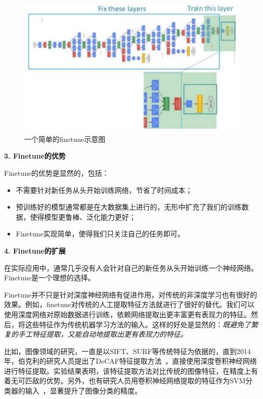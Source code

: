 \begin{figure}[htbp]
	\centering
	\includegraphics[scale=0.6]{./figures/fig-deep-finetune.pdf}
	\caption{一个简单的finetune示意图}
	\label{fig-deep-finetune}
\end{figure}

\textbf{3. Finetune的优势}

Finetune的优势是显然的，包括：

\begin{itemize}
	\item 不需要针对新任务从头开始训练网络，节省了时间成本；
	\item 预训练好的模型通常都是在大数据集上进行的，无形中扩充了我们的训练数据，使得模型更鲁棒、泛化能力更好；
	\item Finetune实现简单，使得我们只关注自己的任务即可。
\end{itemize}

\textbf{4. Finetune的扩展}

在实际应用中，通常几乎没有人会针对自己的新任务从头开始训练一个神经网络。Finetune是一个理想的选择。

Finetune并不只是针对深度神经网络有促进作用，对传统的非深度学习也有很好的效果。例如，finetune对传统的人工提取特征方法就进行了很好的替代。我们可以使用深度网络对原始数据进行训练，依赖网络提取出更丰富更有表现力的特征。然后，将这些特征作为传统机器学习方法的输入。这样的好处是显然的：\textit{既避免了繁复的手工特征提取，又能自动地提取出更有表现力的特征。}

比如，图像领域的研究，一直是以SIFT、SURF等传统特征为依据的，直到2014年，伯克利的研究人员提出了DeCAF特征提取方法~\cite{donahue2014decaf}，直接使用深度卷积神经网络进行特征提取。实验结果表明，该特征提取方法对比传统的图像特征，在精度上有着无可匹敌的优势。另外，也有研究人员用卷积神经网络提取的特征作为SVM分类器的输入~\cite{razavian2014cnn}，显著提升了图像分类的精度。

